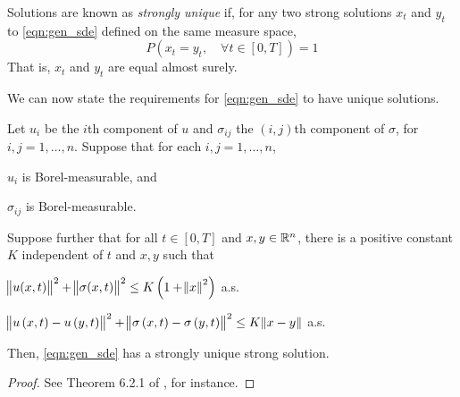 Solutions are known as \emph{strongly unique} if, for any two strong solutions \(x_t\) and \(y_t\) to \eqref{eqn:gen_sde} defined on the same measure space,
\[
	P\left(x_t = y_t, \quad \forall t \in \left[0,T\right]\right) = 1
\]
That is, \(x_t\) and \(y_t\) are equal almost surely.

We can now state the requirements for \eqref{eqn:gen_sde} to have unique solutions.
\begin{theorem}
	Let \(u_i\) be the \(i\)th component of \(u\) and \(\sigma_{ij}\) the \((i,j)\)th component of \(\sigma\), for \(i,j = 1,\hdots,n\).
	Suppose that for each \(i,j = 1,\hdots,n\),
	\begin{romanate}
		\item \(u_i\) is Borel-measurable, and
		\item \(\sigma_{ij}\) is Borel-measurable.
	\end{romanate}
	Suppose further that for all \(t \in [0,T]\) and \(x,y \in \mathbb{R}^n\), there is a positive constant \(K\) independent of \(t\) and \(x, y\) such that
	\begin{romanate}
		\setcounter{enumi}{2}
		\item \(\norm{u(x,t)}^2 + \norm{\sigma(x,t)}^2 \leq K\left(1 + \norm{x}^2\right)\) a.s.
		\item \(\norm{u\left(x,t\right) - u\left(y,t\right)}^2 + \norm{\sigma\left(x,t\right) - \sigma\left(y,t\right)}^2 \leq K\norm{x - y}\) a.s.
	\end{romanate}
	Then, \eqref{eqn:gen_sde} has a strongly unique strong solution.
\end{theorem}
\begin{proof}
	See Theorem 6.2.1 of \cite{KallianpurSundar_2014_StochasticAnalysisDiffusion}, for instance.
\end{proof}




